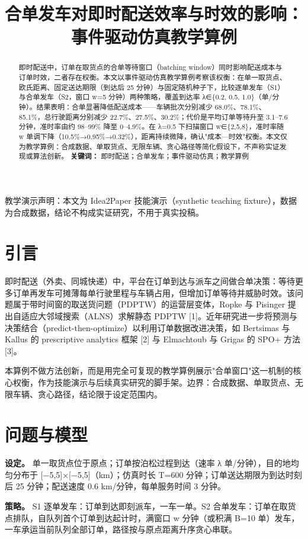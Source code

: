 \documentclass[12pt,a4paper]{ctexart}
\title{\sffamily\bfseries\fontsize{22}{28}\selectfont 合单发车对即时配送效率与时效的影响：事件驱动仿真教学算例}
\author{}
\date{}
\begin{document}
\maketitle
教学演示声明：本文为 Idea2Paper 技能演示（synthetic teaching fixture），数据为合成数据，结论不构成实证研究，不用于真实投稿。

\begin{abstract}
即时配送中，订单在取货点的合单等待窗口（batching window）同时影响配送成本与订单时效，二者存在权衡。本文以事件驱动仿真教学算例考察该权衡：在单一取货点、欧氏距离、固定送达期限（到达后 25 分钟）与固定随机种子下，比较逐单发车（S1）与合单发车（S2，窗口 w=5 分钟）两种策略，覆盖到达率 λ∈\{0.2, 0.5, 1.0\}（单/分钟）。结果表明：合单显著降低配送成本——车辆批次分别减少 68.0\%、78.1\%、85.1\%，总行驶距离分别减少 22.7\%、27.5\%、30.2\%；代价是平均订单等待升至 3.1–7.6 分钟，准时率由约 98–99\% 降至 0–4.9\%。在 λ=0.5 下扫描窗口 w∈\{2,5,8\}，准时率随 w 单调下降（10.5\%→0.95\%→0.32\%），距离持续微降，确认"成本—时效"权衡。本文仅为教学算例：合成数据、单取货点、无限车辆、贪心路径等简化假设下，不声称实证发现或算法创新。
\textbf{关键词：} 即时配送；合单发车；事件驱动仿真；教学算例
\end{abstract}
\section{引言}
即时配送（外卖、同城快递）中，平台在订单到达与派车之间做合单决策：等待更多订单再发车可摊薄每单行驶里程与车辆占用，但增加订单等待并威胁时效。该问题属于带时间窗的取送货问题（PDPTW）的运营层变体，Ropke 与 Pisinger 提出自适应大邻域搜索（ALNS）求解静态 PDPTW [1]。近年研究进一步将预测与决策结合（predict-then-optimize）以利用订单数据改进决策，如 Bertsimas 与 Kallus 的 prescriptive analytics 框架 [2] 与 Elmachtoub 与 Grigas 的 SPO+ 方法 [3]。

本算例不做方法创新，而是用完全可复现的教学算例展示"合单窗口"这一机制的核心权衡，作为技能演示与后续真实研究的脚手架。边界：合成数据、单取货点、无限车辆、贪心路径，结论限于设定范围内。

\section{问题与模型}
\textbf{设定。} 单一取货点位于原点；订单按泊松过程到达（速率 λ 单/分钟），目的地均匀分布于 [−5,5]×[−5,5]（km）；仿真时长 T=600 分钟；订单送达期限为到达时刻后 25 分钟；配送速度 0.6 km/分钟，每单服务时间 3 分钟。

\textbf{策略。} S1 逐单发车：订单到达即刻派车，一车一单。S2 合单发车：订单在取货点排队，自队列首个订单到达起计时，满窗口 w 分钟（或积满 B=10 单）发车，一车承运当前队列全部订单，路径按与原点距离升序贪心串联。
\end{document}

